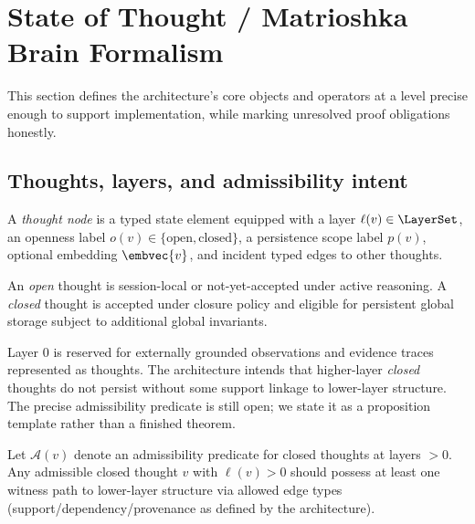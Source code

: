\iffalse
\section{State of Thought / Matrioshka Brain Formalism}
\label{sec:formalism}

This section defines the architecture's core objects and operators at a level precise enough to support implementation, while marking unresolved proof obligations honestly.

\subsection{Thoughts, layers, and admissibility intent}
\begin{definition}
\label{def:thought-node}
A \emph{thought node} is a typed state element equipped with a layer $\ell(v)\in\LayerSet$, an openness label $o(v)\in\{\text{open},\text{closed}\}$, a persistence scope label $p(v)$, optional embedding $\embvec{v}$, and incident typed edges to other thoughts.
\end{definition}

\begin{definition}
\label{def:open-closed}
An \emph{open} thought is session-local or not-yet-accepted under active reasoning.
A \emph{closed} thought is accepted under closure policy and eligible for persistent global storage subject to additional global invariants.
\end{definition}

Layer $0$ is reserved for externally grounded observations and evidence traces represented as thoughts.
The architecture intends that higher-layer \emph{closed} thoughts do not persist without some support linkage to lower-layer structure.
The precise admissibility predicate is still open; we state it as a proposition template rather than a finished theorem.

\begin{proposition}
\label{prop:support-template}
Let $\mathcal{A}(v)$ denote an admissibility predicate for closed thoughts at layers $>0$.
Any admissible closed thought $v$ with $\ell(v)>0$ should possess at least one witness path to lower-layer structure via allowed edge types (support/dependency/provenance as defined by the architecture).
\end{proposition}

